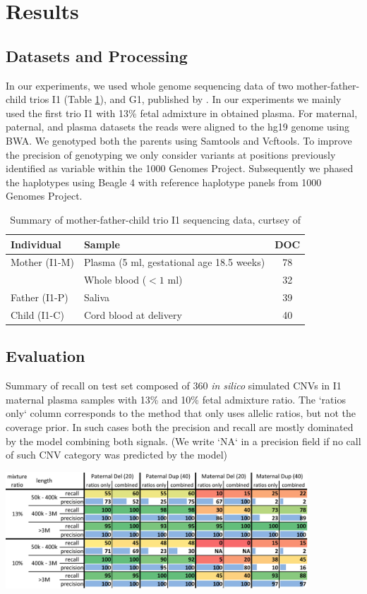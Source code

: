 \section{Results}

\subsection{Datasets and Processing}
\label{data}
In our experiments, we used whole genome sequencing data of two mother-father-child trios I1 (Table \ref{tab:I1}), and G1, published by \cite{kitzman2012}. In our experiments we mainly used the first trio I1 with 13\% fetal admixture in obtained plasma. For maternal, paternal, and plasma datasets the reads were aligned to the hg19 genome using BWA. We genotyped both the parents using Samtools and Vcftools. To improve the precision of genotyping we only consider variants at positions previously identified as variable within the 1000 Genomes Project.  Subsequently we phased the haplotypes using Beagle 4 \citep{browning2013} with reference haplotype panels from 1000 Genomes Project. 
\begin{table}
\caption{Summary of mother-father-child trio I1 sequencing data, curtsey of \cite{kitzman2012}  }
\label{tab:I1}
\centering
\footnotesize
\begin{tabular}{l|l|c}
\hline
Individual & Sample & DOC \\ \hline\hline
Mother (I1-M) & Plasma (5 ml, gestational age 18.5 weeks) & 78 \\
	& Whole blood ($<1$ ml) & 32 \\
Father (I1-P) & Saliva & 39 \\
Child (I1-C) & Cord blood at delivery & 40 \\
\hline
\end{tabular}
\end{table}

\subsection{Evaluation}
\begin{table}
\caption{Summary of recall on test set composed of 360 \emph{in silico} simulated CNVs in I1 maternal plasma samples with 13\% and 10\% fetal admixture ratio. The `ratios only` column corresponds to the method that only uses allelic ratios, but not the coverage prior. In such cases both the precision and  recall are mostly dominated by the model combining both signals. (We write `NA` in a precision field if no call of such CNV category was predicted by the model)}
\label{tab:resRecall}
\centering
\includegraphics[width=0.85\textwidth]{figures/ismb_res_color}
\end{table}

